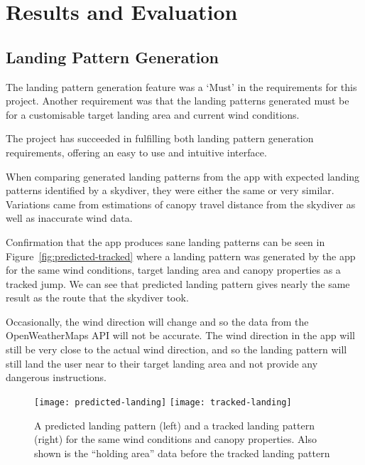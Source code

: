 \section{Results and Evaluation}\label{sec:results-and-evaluation}

\subsection{Landing Pattern Generation}
The landing pattern generation feature was a `Must' in the requirements for this project. Another requirement was that the landing patterns generated must be for a customisable target landing area and current wind conditions.

The project has succeeded in fulfilling both landing pattern generation requirements, offering an easy to use and intuitive interface.

When comparing generated landing patterns from the app with expected landing patterns identified by a skydiver, they were either the same or very similar. Variations came from estimations of canopy travel distance from the skydiver as well as inaccurate wind data.

Confirmation that the app produces sane landing patterns can be seen in Figure~\vref{fig:predicted-tracked} where a landing pattern was generated by the app for the same wind conditions, target landing area and canopy properties as a tracked jump. We can see that predicted landing pattern gives nearly the same result as the route that the skydiver took.

Occasionally, the wind direction will change and so the data from the OpenWeatherMaps API will not be accurate. The wind direction in the app will still be very close to the actual wind direction, and so the landing pattern will still land the user near to their target landing area and not provide any dangerous instructions.

\begin{figure}[ht]
  \centering
  \texttt{[image: predicted-landing]}
  \hspace{1cm}
  \texttt{[image: tracked-landing]}
  \caption{A predicted landing pattern (left) and a tracked landing pattern (right) for the same wind conditions and canopy properties. Also shown is the ``holding area'' data before the tracked landing pattern}\label{fig:predicted-tracked}
\end{figure}

